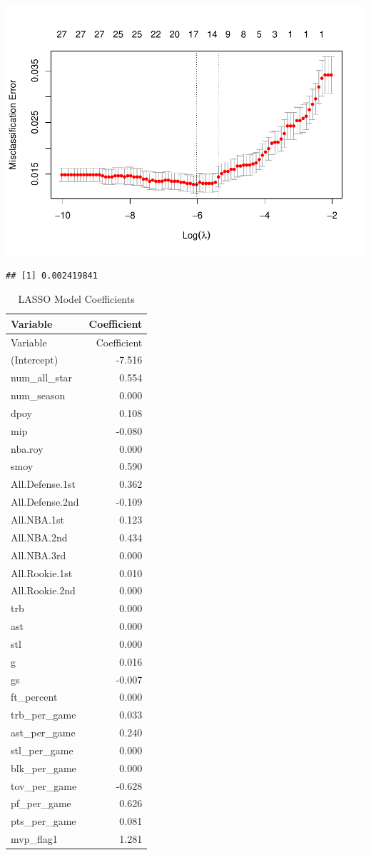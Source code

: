 \documentclass[
  11pt,
]{article}
\begin{document}
\includegraphics{report_files/figure-latex/unnamed-chunk-10-1.pdf}

\begin{verbatim}
## [1] 0.002419841
\end{verbatim}

\begin{longtable}[]{@{}lr@{}}
\caption{LASSO Model Coefficients}\tabularnewline
\toprule\noalign{}
Variable & Coefficient \\
\midrule\noalign{}
\endfirsthead
\toprule\noalign{}
Variable & Coefficient \\
\midrule\noalign{}
\endhead
\bottomrule\noalign{}
\endlastfoot
(Intercept) & -7.516 \\
num\_all\_star & 0.554 \\
num\_season & 0.000 \\
dpoy & 0.108 \\
mip & -0.080 \\
nba.roy & 0.000 \\
smoy & 0.590 \\
All.Defense.1st & 0.362 \\
All.Defense.2nd & -0.109 \\
All.NBA.1st & 0.123 \\
All.NBA.2nd & 0.434 \\
All.NBA.3rd & 0.000 \\
All.Rookie.1st & 0.010 \\
All.Rookie.2nd & 0.000 \\
trb & 0.000 \\
ast & 0.000 \\
stl & 0.000 \\
g & 0.016 \\
gs & -0.007 \\
ft\_percent & 0.000 \\
trb\_per\_game & 0.033 \\
ast\_per\_game & 0.240 \\
stl\_per\_game & 0.000 \\
blk\_per\_game & 0.000 \\
tov\_per\_game & -0.628 \\
pf\_per\_game & 0.626 \\
pts\_per\_game & 0.081 \\
mvp\_flag1 & 1.281 \\
\end{longtable}
\end{document}
